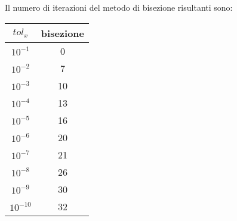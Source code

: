 
\begin{flushleft}
Il numero di iterazioni del metodo di bisezione risultanti sono:
\end{flushleft}

\begin{tabular}{|c|c|}
\hline
$tol_x$ & bisezione \\
\hline
$10^{-1}$ & 0 \\
$10^{-2}$ & 7 \\
$10^{-3}$ & 10 \\
$10^{-4}$ & 13 \\
$10^{-5}$ & 16 \\
$10^{-6}$ & 20 \\
$10^{-7}$ & 21 \\
$10^{-8}$ & 26 \\
$10^{-9}$ & 30 \\
$10^{-10}$ & 32 \\
\hline
\end{tabular}